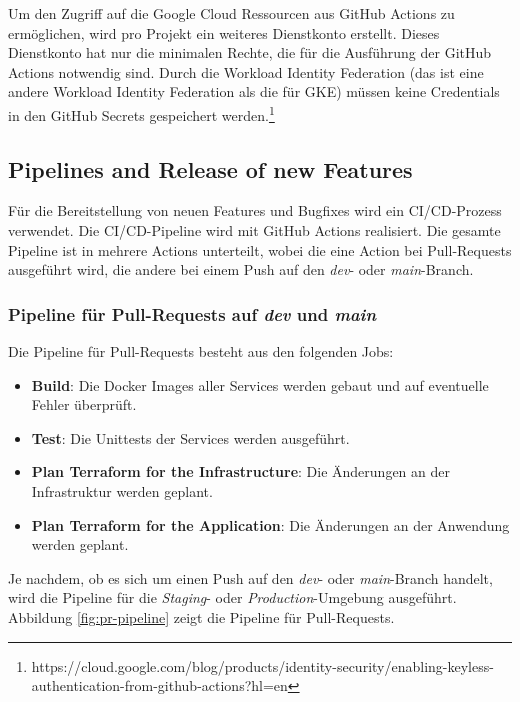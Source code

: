 Um den Zugriff auf die Google Cloud Ressourcen aus GitHub Actions zu ermöglichen,
wird pro Projekt ein weiteres Dienstkonto erstellt. Dieses Dienstkonto hat nur die minimalen Rechte,
die für die Ausführung der GitHub Actions notwendig sind. Durch die \glqq{}Workload Identity Federation\grqq{}
(das ist eine andere Workload Identity Federation als die für GKE) müssen keine Credentials
in den GitHub Secrets gespeichert werden.\footnote{https://cloud.google.com/blog/products/identity-security/enabling-keyless-authentication-from-github-actions?hl=en}

\subsection{Pipelines and Release of new Features}

Für die Bereitstellung von neuen Features und Bugfixes wird ein CI/CD-Prozess verwendet.
Die CI/CD-Pipeline wird mit GitHub Actions realisiert.
Die gesamte Pipeline ist in mehrere Actions unterteilt, wobei die eine Action bei Pull-Requests ausgeführt wird,
die andere bei einem Push auf den \textit{dev}- oder \textit{main}-Branch.

\subsubsection*{Pipeline für Pull-Requests auf \textit{dev} und \textit{main}}

Die Pipeline für Pull-Requests besteht aus den folgenden Jobs:
\begin{itemize}
  \item \textbf{Build}: Die Docker Images aller Services werden gebaut und auf eventuelle Fehler überprüft.
  \item \textbf{Test}: Die Unittests der Services werden ausgeführt.
  \item \textbf{Plan Terraform for the Infrastructure}: Die Änderungen an der Infrastruktur werden geplant.
  \item \textbf{Plan Terraform for the Application}: Die Änderungen an der Anwendung werden geplant.
\end{itemize}

Je nachdem, ob es sich um einen Push auf den \textit{dev}- oder \textit{main}-Branch handelt, wird die Pipeline
für die \textit{Staging}- oder \textit{Production}-Umgebung ausgeführt. 
Abbildung \ref{fig:pr-pipeline} zeigt die Pipeline für Pull-Requests.

